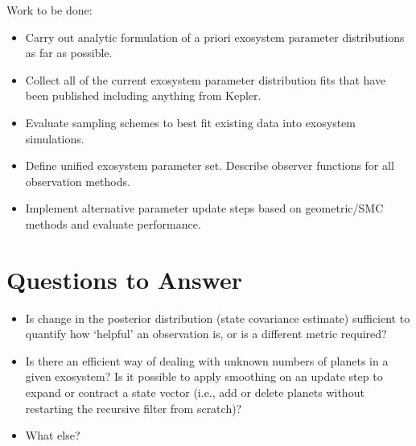 \documentclass[oneside,11pt]{amsart}
\begin{document}
Work to be done:
\begin{itemize}
\item Carry out analytic formulation of a priori exosystem parameter distributions as far as possible.
\item Collect all of the current exosystem parameter distribution fits that have been published including anything from Kepler.
\item Evaluate sampling schemes to best fit existing data into exosystem simulations.
\item Define unified exosystem parameter set.  Describe observer functions for all observation methods.
\item Implement alternative parameter update steps based on geometric/SMC methods and evaluate performance. 
\end{itemize}

\section{Questions to Answer}
\begin{itemize}
\item Is change in the posterior distribution (state covariance estimate) sufficient to quantify how `helpful' an observation is, or is a different metric required?
\item Is there an efficient way of dealing with unknown numbers of planets in a given exosystem?  Is it possible to apply smoothing on an update step to expand or contract a state vector (i.e., add or delete planets without restarting the recursive filter from scratch)?
\item What else?
\end{itemize}
\end{document}
